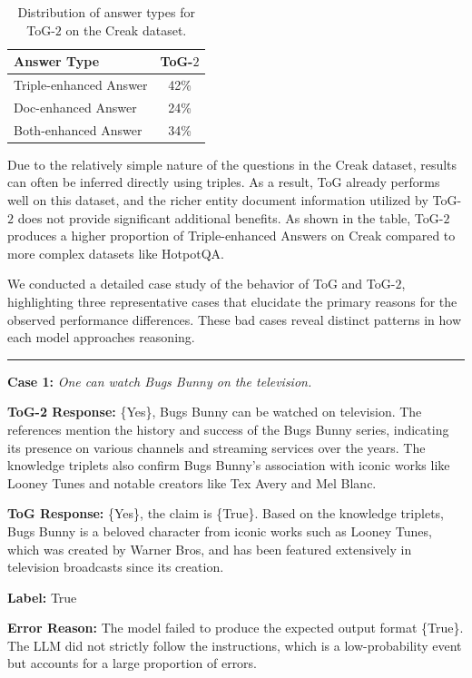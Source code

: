 \documentclass{article} %
\begin{document}
\begin{table}[ht]
\centering
\begin{tabular}{lc}
\toprule
\textbf{Answer Type}           & \textbf{ToG-$2$} \\ 
\midrule
Triple-enhanced Answer         & 42\%            \\ 
Doc-enhanced Answer            & 24\%            \\ 
Both-enhanced Answer           & 34\%            \\ 
\bottomrule
\end{tabular}
\caption{Distribution of answer types for ToG-$2$ on the Creak dataset.}
\label{tab:creak}
\end{table}


Due to the relatively simple nature of the questions in the Creak dataset, results can often be inferred directly using triples. As a result, ToG already performs well on this dataset, and the richer entity document information utilized by ToG-$2$ does not provide significant additional benefits. As shown in the table, ToG-$2$ produces a higher proportion of Triple-enhanced Answers on Creak compared to more complex datasets like HotpotQA.

We conducted a detailed case study of the behavior of ToG and ToG-$2$, highlighting three representative cases that elucidate the primary reasons for the observed performance differences. These bad cases reveal distinct patterns in how each model approaches reasoning.

\rule{\textwidth}{0.5pt}
\textbf{Case 1:} \emph{One can watch Bugs Bunny on the television.}

\noindent\textbf{ToG-2 Response:} \{Yes\}, Bugs Bunny can be watched on television. The references mention the history and success of the Bugs Bunny series, indicating its presence on various channels and streaming services over the years. The knowledge triplets also confirm Bugs Bunny's association with iconic works like Looney Tunes and notable creators like Tex Avery and Mel Blanc.

\noindent\textbf{ToG Response:} \{Yes\}, the claim is \{True\}. Based on the knowledge triplets, Bugs Bunny is a beloved character from iconic works such as Looney Tunes, which was created by Warner Bros, and has been featured extensively in television broadcasts since its creation.

\noindent\textbf{Label:} True

\noindent\textbf{Error Reason:} The model failed to produce the expected output format \{True\}. The LLM did not strictly follow the instructions, which is a low-probability event but accounts for a large proportion of errors.
\end{document}

